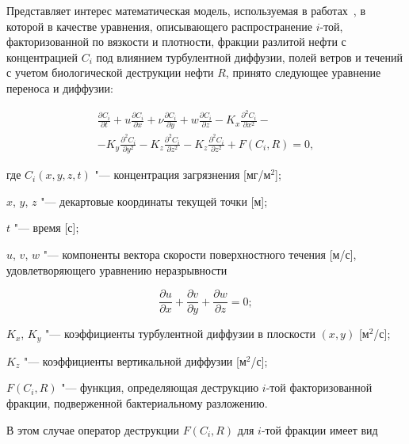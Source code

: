 Представляет интерес математическая модель, используемая в работах~\cite{afa:add:2, afa:bib7, afa:bib8}, в которой в качестве уравнения, описывающего распространение $i$-той, факторизованной по вязкости и плотности, фракции разлитой нефти с концентрацией $C_{i}$ под влиянием турбулентной диффузии, полей ветров и течений с учетом биологической деструкции нефти $R$, принято следующее уравнение переноса и диффузии:

\begin{multline}

\label{afa:eq1}

\frac{\partial C_i }{\partial t}+u\frac{\partial C_i }{\partial x}+\nu

\frac{\partial C_i }{\partial y}+w\frac{\partial C_i }{\partial z}-K_x

\frac{\partial ^2C_i }{\partial x^2}-\\

-K_y \frac{\partial ^2C_i }{\partial

y^2}-K_z \frac{\partial ^2C_i }{\partial z^2}-K_z \frac{\partial ^2C_i

}{\partial z^2}+F\left( {C_i ,R} \right)=0,

\end{multline}

где $C_i (x, y, z, t)$ "--- концентрация загрязнения [мг/м$^2$]; 

$x$, $y$, $z$ "--- декартовые координаты текущей точки [м]; 

$t$ "--- время [с]; 

$u$, $v$, $w$ "--- компоненты вектора скорости поверхностного течения [м/с], удовлетворяющего уравнению неразрывности

\begin{equation}

\label{afa:eq2}

\frac{\partial u}{\partial x}+\frac{\partial v}{\partial y}+\frac{\partial

w}{\partial z}=0;

\end{equation}

$K_{x}$, $K_{y}$ "--- коэффициенты турбулентной диффузии в плоскости $(x, y)$ [м$^{2}$/с]; 

$K_{z}$ "--- коэффициенты вертикальной диффузии [м$^{2}$/с];

$F(C_i, R)$ "--- функция, оп\-ределяющая деструкцию $i$-той факторизованной фракции, подверженной бактериальному разложению. 

В этом случае оператор деструкции $F(C_{i}, R) $ для $i$-той фракции имеет вид

